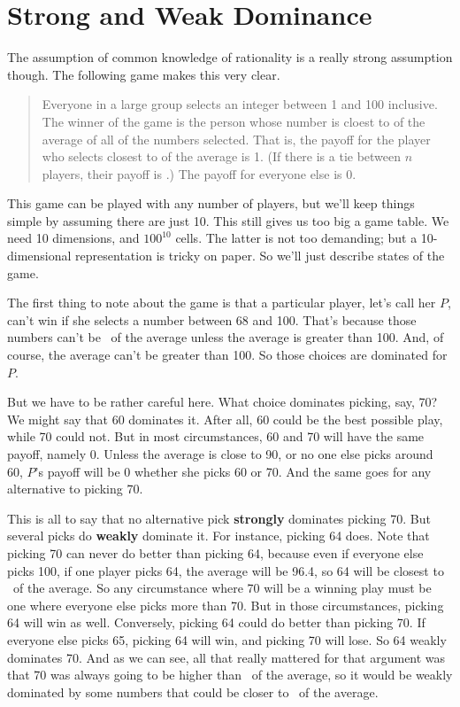 \section{Strong and Weak Dominance}
The assumption of common knowledge of rationality is a really strong assumption though. The following game makes this very clear.

\begin{quote}

Everyone in a large group selects an integer between 1 and 100 inclusive. The winner of the game is the person whose number is cloest to  of the average of all of the numbers selected. That is, the payoff for the player who selects closest to  of the average is 1. (If there is a tie between $n$ players, their payoff is .) The payoff for everyone else is 0.
\end{quote}

\noindent This game can be played with any number of players, but we'll keep things simple by assuming there are just 10. This still gives us too big a game table. We need 10 dimensions, and $100^{10}$ cells. The latter is not too demanding; but a 10-dimensional representation is tricky on paper. So we'll just describe states of the game.

\newcommand{\twothirds}{\nicefrac{2}{3}}

The first thing to note about the game is that a particular player, let's call her $P$, can't win if she selects a number between 68 and 100. That's because those numbers can't be \twothirds\ of the average unless the average is greater than 100. And, of course, the average can't be greater than 100. So those choices are dominated for $P$.

But we have to be rather careful here. What choice dominates picking, say, 70? We might say that 60 dominates it. After all, 60 could be the best possible play, while 70 could not. But in most circumstances, 60 and 70 will have the same payoff, namely 0. Unless the average is close to 90, or no one else picks around 60, $P$'s payoff will be 0 whether she picks 60 or 70. And the same goes for any alternative to picking 70.

This is all to say that no alternative pick \textbf{strongly} dominates picking 70. But several picks do \textbf{weakly} dominate it. For instance, picking 64 does. Note that picking 70 can never do better than picking 64, because even if everyone else picks 100, if one player picks 64, the average will be 96.4, so 64 will be closest to \twothirds\ of the average. So any circumstance where 70 will be a winning play must be one where everyone else picks more than 70. But in those circumstances, picking 64 will win as well. Conversely, picking 64 could do better than picking 70. If everyone else picks 65, picking 64 will win, and picking 70 will lose. So 64 weakly dominates 70. And as we can see, all that really mattered for that argument was that 70 was always going to be higher than \twothirds\ of the average, so it would be weakly dominated by some numbers that could be closer to \twothirds\ of the average.

